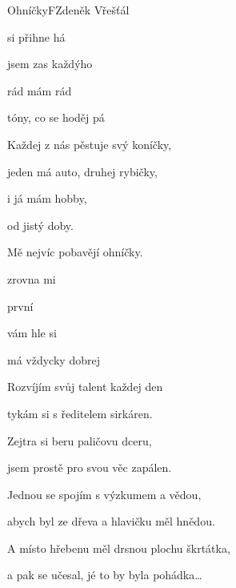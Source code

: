 \setcounter{page}{60}
\begin{song}{Ohníčky}{F}{Zdeněk Vřešťál}

\begin{SBVerse}

 si  přihne há

jsem zas každýho 

 rád  mám rád 

tóny, co se hoděj  pá

\end{SBVerse}

\begin{SBVerse}

Každej z nás pěstuje svý koníčky,

jeden má auto, druhej rybičky,

i já mám hobby,

od jistý doby.

Mě nejvíc pobavějí ohníčky.

\end{SBVerse}

\begin{SBChorus*}

zrovna  mi  

první   

 vám  hle si 

 má vždycky dobrej  

\end{SBChorus*}

\begin{SBVerse}

Rozvíjím svůj talent každej den

tykám si s ředitelem sirkáren.

Zejtra si beru paličovu dceru,

jsem prostě pro svou věc zapálen.

\end{SBVerse}

\begin{SBChorus*}

Jednou se spojím s výzkumem a vědou,

abych byl ze dřeva a hlavičku měl hnědou.

A místo hřebenu měl drsnou plochu škrtátka,

a pak se učesal, jé to by byla pohádka…

\end{SBChorus*}

\end{song}

\pagebreak
